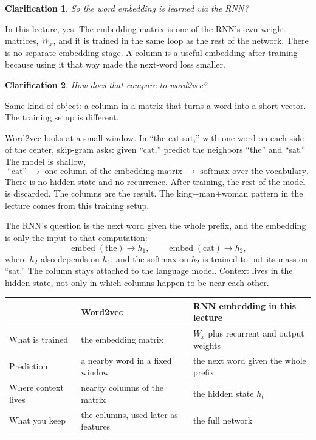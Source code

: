 \documentclass[11pt]{article}
\newtheorem*{clarification}{Clarification}
\begin{document}
\begin{clarification}
So the word embedding is learned via the RNN?
\end{clarification}

In this lecture, yes. The embedding matrix is one of the RNN's own weight
matrices, \(W_x\), and it is trained in the same loop as the rest of the
network. There is no separate embedding stage. A column is a useful
embedding after training because using it that way made the next-word loss
smaller.

\begin{clarification}
How does that compare to word2vec?
\end{clarification}

Same kind of object: a column in a matrix that turns a word into a short
vector. The training setup is different.

Word2vec looks at a small window. In ``the cat sat,'' with one word on each
side of the center, skip-gram asks: given ``cat,'' predict the neighbors
``the'' and ``sat.'' The model is shallow,
\[
\text{``cat''}
\;\rightarrow\;
\text{one column of the embedding matrix}
\;\rightarrow\;
\text{softmax over the vocabulary}.
\]
There is no hidden state and no recurrence. After training, the rest of the
model is discarded. The columns are the result. The king\(-\)man\(+\)woman
pattern in the lecture comes from this training setup.

The RNN's question is the next word given the whole prefix, and the
embedding is only the input to that computation:
\[
\operatorname{embed}(\text{the})\rightarrow h_1,
\qquad
\operatorname{embed}(\text{cat})\rightarrow h_2,
\]
where \(h_2\) also depends on \(h_1\), and the softmax on \(h_2\) is trained
to put its mass on ``sat.'' The column stays attached to the language
model. Context lives in the hidden state, not only in which columns happen
to be near each other.

\begin{center}
\begin{tabular}{@{}lll@{}}
\toprule
 & Word2vec & RNN embedding in this lecture \\
\midrule
What is trained & the embedding matrix & \(W_x\) plus recurrent and output weights \\
Prediction & a nearby word in a fixed window & the next word given the whole prefix \\
Where context lives & nearby columns of the matrix & the hidden state \(h_t\) \\
What you keep & the columns, used later as features & the full network \\
\bottomrule
\end{tabular}
\end{center}
\end{document}
